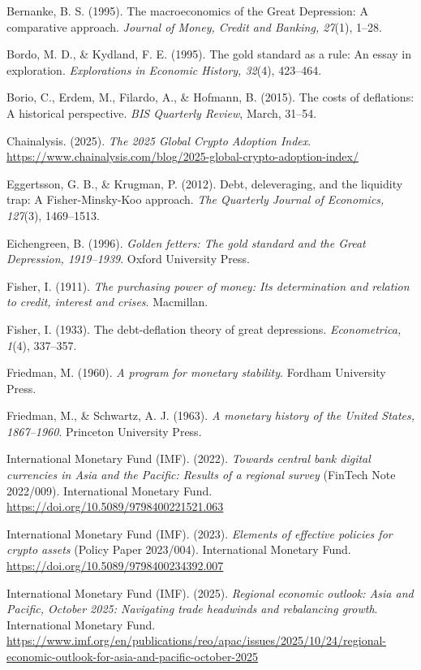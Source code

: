 \documentclass[12pt]{article}
\begin{document}
Bernanke, B. S. (1995). The macroeconomics of the Great Depression: A comparative approach. \emph{Journal of Money, Credit and Banking, 27}(1), 1--28.

Bordo, M. D., \& Kydland, F. E. (1995). The gold standard as a rule: An essay in exploration. \emph{Explorations in Economic History, 32}(4), 423--464.

Borio, C., Erdem, M., Filardo, A., \& Hofmann, B. (2015). The costs of deflations: A historical perspective. \emph{BIS Quarterly Review}, March, 31--54.

Chainalysis. (2025). \emph{The 2025 Global Crypto Adoption Index}. \url{https://www.chainalysis.com/blog/2025-global-crypto-adoption-index/}

Eggertsson, G. B., \& Krugman, P. (2012). Debt, deleveraging, and the liquidity trap: A Fisher-Minsky-Koo approach. \emph{The Quarterly Journal of Economics, 127}(3), 1469--1513.

Eichengreen, B. (1996). \emph{Golden fetters: The gold standard and the Great Depression, 1919--1939}. Oxford University Press.

Fisher, I. (1911). \emph{The purchasing power of money: Its determination and relation to credit, interest and crises}. Macmillan.

Fisher, I. (1933). The debt-deflation theory of great depressions. \emph{Econometrica, 1}(4), 337--357.

Friedman, M. (1960). \emph{A program for monetary stability}. Fordham University Press.

Friedman, M., \& Schwartz, A. J. (1963). \emph{A monetary history of the United States, 1867--1960}. Princeton University Press.

International Monetary Fund (IMF). (2022). \emph{Towards central bank digital currencies in Asia and the Pacific: Results of a regional survey} (FinTech Note 2022/009). International Monetary Fund. \url{https://doi.org/10.5089/9798400221521.063}

International Monetary Fund (IMF). (2023). \emph{Elements of effective policies for crypto assets} (Policy Paper 2023/004). International Monetary Fund. \url{https://doi.org/10.5089/9798400234392.007}

International Monetary Fund (IMF). (2025). \emph{Regional economic outlook: Asia and Pacific, October 2025: Navigating trade headwinds and rebalancing growth}. International Monetary Fund. \url{https://www.imf.org/en/publications/reo/apac/issues/2025/10/24/regional-economic-outlook-for-asia-and-pacific-october-2025}
\end{document}
